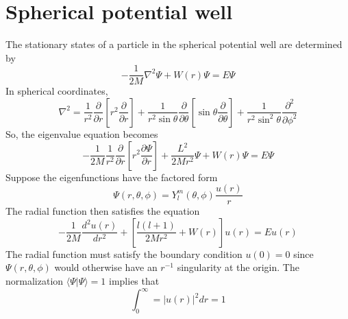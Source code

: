 \section{Spherical potential well}
The stationary states of a particle in the spherical potential well are determined by
\[-\frac{1}{2M}\nabla^2 \Psi  + W(r) \Psi = E\Psi \]
In spherical coordinates, 
\[\nabla^2 = \frac{1}{r^2} \frac{\partial}{\partial r} \left [ r^2\frac{\partial}{\partial r} \right ] + \frac{1}{r^2\sin\theta} \frac{\partial}{\partial \theta} \left [\sin\theta \frac{\partial}{\partial \theta} \right ] + \frac{1}{r^2\sin^2\theta} \frac{\partial^2}{\partial\phi^2}\]
So, the eigenvalue equation becomes
\[-\frac{1}{2M} \frac{1}{r^2} \frac{\partial}{\partial r} \left [ r^2\frac{\partial \Psi}{\partial r}\right ]  + \frac{L^2}{2Mr^2} \Psi + W(r)\Psi = E\Psi\]
Suppose the eigenfunctions have the factored form
\[\Psi(r,\theta,\phi) = Y_l^m(\theta,\phi) \frac{u(r)}{r}\]
The radial function then satisfies the equation
\[-\frac{1}{2M} \frac{d^2 u(r)}{dr^2} + \left[ \frac{l(l+1)}{2Mr^2} + W(r)\right]u(r) = Eu(r)\]
The radial function must satisfy the boundary condition $u(0) = 0$ since $\Psi(r,\theta,\phi)$ would otherwise have an $r^{-1}$ singularity at the origin. The normalization $\langle \Psi | \Psi \rangle = 1$ implies that
\[\int_0^{\infty} = |u(r)|^2 dr = 1\]

